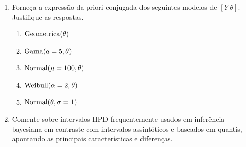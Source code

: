 \documentclass[11pt,a4]{article}\usepackage[]{graphicx}\usepackage[]{xcolor}
\begin{document}
\begin{enumerate}
  \newpage

  

\item Forneça a expressão da priori conjugada dos seguintes modelos de $[Y|\theta]$. Justifique as respostas.
  \begin{enumerate}
  \item ${\rm Geometrica}(\theta)$
  \item ${\rm Gama}(a = 5, \theta)$
  \item ${\rm Normal}(\mu = 100, \theta)$
  \item ${\rm Weibull}(\alpha = 2, \theta)$
  \item ${\rm Normal}(\theta, \sigma = 1)$    
\end{enumerate}



  
\item Comente sobre intervalos HPD frequentemente usados em inferência
  bayesiana em contraste com intervalos assintóticos e baseados em
  quantis, apontando as principais características e diferenças.


\end{enumerate}
\end{document}
